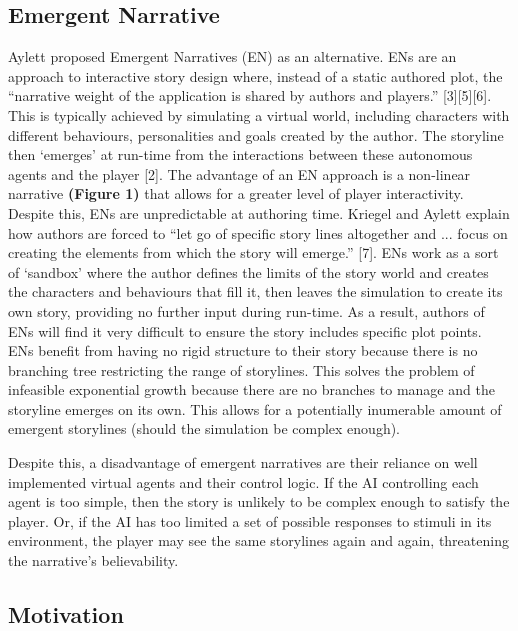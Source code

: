 \documentclass{sig-alternate-05-2015}
\begin{document}
\subsection{Emergent Narrative}

Aylett proposed Emergent Narratives (EN) as an alternative. ENs are an approach to interactive story design where, instead of a static authored plot, the ``narrative weight of the application is shared by authors and players.'' [3][5][6]. This is typically achieved by simulating a virtual world, including characters with different behaviours, personalities and goals created by the author. The storyline then `emerges' at run-time from the interactions between these autonomous agents and the player [2]. The advantage of an EN approach is a non-linear narrative \textbf{(Figure 1)} that allows for a greater level of player interactivity. Despite this, ENs are unpredictable at authoring time. Kriegel and Aylett explain how authors are forced to ``let go of specific story lines altogether and ... focus on creating the elements from which the story will emerge.'' [7]. ENs work as a sort of `sandbox' where the author defines the limits of the story world and creates the characters and behaviours that fill it, then leaves the simulation to create its own story, providing no further input during run-time. As a result, authors of ENs will find it very difficult to ensure the story includes specific plot points.\\

\newline ENs benefit from having no rigid structure to their story because there is no branching tree restricting the range of storylines. This solves the problem of infeasible exponential growth because there are no branches to manage and the storyline emerges on its own. This allows for a potentially inumerable amount of emergent storylines (should the simulation be complex enough).

Despite this, a disadvantage of emergent narratives are their reliance on well implemented virtual agents and their control logic. If the AI controlling each agent is too simple, then the story is unlikely to be complex enough to satisfy the player. Or, if the AI has too limited a set of possible responses to stimuli in its environment, the player may see the same storylines again and again, threatening the narrative's believability.

\subsection{Motivation}
\end{document}
